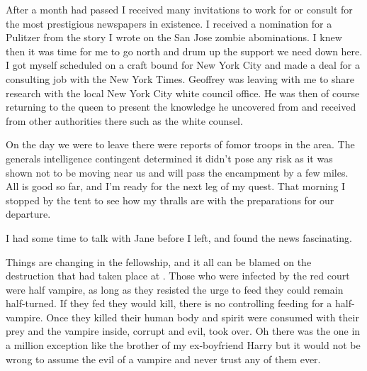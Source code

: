 After a month had passed I received many invitations to work for or consult for the most prestigious newspapers in existence. I received a nomination for a Pulitzer from the story I wrote on the San Jose zombie abominations. I knew then it was time for me to go north and drum up the support we need down here. I got myself scheduled on a craft bound for New York City and made a deal for a consulting job with the New York Times. Geoffrey was leaving with me to share \chichenitza* research with the local New York City white council office. He was then of course returning to the queen to present the knowledge he uncovered from \chichenitza* and received from other authorities there such as the white counsel.

On the day we were to leave there were reports of fomor troops in the area. The generals intelligence contingent determined it didn't pose any risk as it was shown not to be moving near us and will pass the encampment by a few miles. All is good so far, and I'm ready for the next leg of my quest. That morning I stopped by the tent to see how my thralls are with the preparations for our departure.

I had some time to talk with Jane before I left, and found the news fascinating.

 Things are changing in the fellowship, and it all can be blamed on the destruction that had taken place at \chichenitza*. Those who were infected by the red court were half vampire, as long as they resisted the urge to feed they could remain half-turned. If they fed they would kill, there is no controlling feeding for a half-vampire. Once they killed their human body and spirit were consumed with their prey and the vampire inside, corrupt and evil, took over. Oh there was the one in a million exception like the brother of my ex-boyfriend Harry but it would not be wrong to assume the evil of a vampire and never trust any of them ever.

